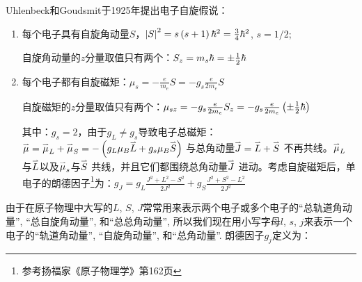 Uhlenbeck和Goudsmit于1925年提出电子自旋假说：


\begin{enumerate}
    \item 每个电子具有自旋角动量$S$，$\left| S \right|^2  = s\left( {s + 1} \right)\hbar ^2  = {\textstyle{3 \over 4}}\hbar ^2 $, $s = 1/2$;

自旋角动量的$z$分量取值只有两个：$S_z  = m_s \hbar  =  \pm
{\textstyle{1 \over 2}}\hbar $


    \item 每个电子都有自旋磁矩：$\mu_s  =  - \frac{e}{m_e }S =  - g_s \frac{e}{{2m_e }}S$

自旋磁矩的$z$分量取值只有两个：$\mu_{sz}  =  - g_s \frac{e}{{2m_e
}}S_z =  - g_s \frac{e}{{2m_e }}\left( { \pm {\textstyle{1 \over
2}}\hbar } \right)$

其中：$g_s  = 2$，由于$g_L  \ne g_s
$导致电子总磁矩：$\mathord{\buildrel{\lower3pt\hbox{$\scriptscriptstyle\rightharpoonup$}}
\over \mu}  =
\mathord{\buildrel{\lower3pt\hbox{$\scriptscriptstyle\rightharpoonup$}}
\over \mu} _L  +
\mathord{\buildrel{\lower3pt\hbox{$\scriptscriptstyle\rightharpoonup$}}
\over \mu} _S  =  - \left( {g_L \mu _B
\mathord{\buildrel{\lower3pt\hbox{$\scriptscriptstyle\rightharpoonup$}}
\over L}  + g_s \mu _B
\mathord{\buildrel{\lower3pt\hbox{$\scriptscriptstyle\rightharpoonup$}}
\over S} } \right)$
与总角动量$\mathord{\buildrel{\lower3pt\hbox{$\scriptscriptstyle\rightharpoonup$}}
\over J}  =
\mathord{\buildrel{\lower3pt\hbox{$\scriptscriptstyle\rightharpoonup$}}
\over L}  +
\mathord{\buildrel{\lower3pt\hbox{$\scriptscriptstyle\rightharpoonup$}}
\over S} $
不再共线。$\mathord{\buildrel{\lower3pt\hbox{$\scriptscriptstyle\rightharpoonup$}}
\over \mu} _L $
与$\mathord{\buildrel{\lower3pt\hbox{$\scriptscriptstyle\rightharpoonup$}}
\over L}
$以及$\mathord{\buildrel{\lower3pt\hbox{$\scriptscriptstyle\rightharpoonup$}}
\over \mu} _s
$与$\mathord{\buildrel{\lower3pt\hbox{$\scriptscriptstyle\rightharpoonup$}}
\over S} $
共线，并且它们都围绕总角动量$\mathord{\buildrel{\lower3pt\hbox{$\scriptscriptstyle\rightharpoonup$}}
\over J} $
进动。考虑自旋磁矩后，单电子的朗德因子\footnote{参考扬福家《原子物理学》第162页}为：$g_J
= g_L \frac{{J^2  + L^2  - S^2 }}{{2J^2 }} + g_S \frac{{J^2  + S^2 -
L^2 }}{{2J^2 }}$

\end{enumerate}

由于在原子物理中大写的$L$, $S$,
$J$常常用来表示两个电子或多个电子的``总轨道角动量'',
``总自旋角动量'', 和``总总角动量'', 所以我们现在用小写字母$l$, $s$,
$j$来表示一个电子的``轨道角动量'', ``自旋角动量'', 和``总角动量''.
朗德因子$g_j$定义为：

